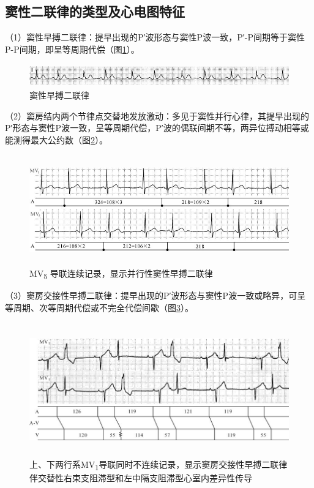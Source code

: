 \subsection{窦性二联律的类型及心电图特征}

（1）窦性早搏二联律：提早出现的P′波形态与窦性P波一致，P′-P间期等于窦性P-P间期，即呈等周期代偿（图\ref{fig37-1}）。

\begin{figure}[!htbp]
 \centering
 \includegraphics[width=5.58333in,height=0.38542in]{./images/Image00595.jpg}
 \captionsetup{justification=centering}
 \caption{窦性早搏二联律}
 \label{fig37-1}
  \end{figure} 

（2）窦房结内两个节律点交替地发放激动：多见于窦性并行心律，其提早出现的P′形态与窦性P波一致，呈等周期代偿，P′波的偶联间期不等，两异位搏动相等或能测得最大公约数（图\ref{fig37-2}）。

\begin{figure}[!htbp]
 \centering
 \includegraphics[width=5.69792in,height=1.875in]{./images/Image00596.jpg}
 \captionsetup{justification=centering}
 \caption{MV\textsubscript{5} 导联连续记录，显示并行性窦性早搏二联律}
 \label{fig37-2}
  \end{figure} 

（3）窦房交接性早搏二联律：提早出现的P′波形态与窦性P波一致或略异，可呈等周期、次等周期代偿或不完全代偿间歇（图\ref{fig37-3}）。

\begin{figure}[!htbp]
 \centering
 \includegraphics[width=5.77083in,height=2.27083in]{./images/Image00597.jpg}
 \captionsetup{justification=centering}
 \caption{上、下两行系MV\textsubscript{1}导联同时不连续记录，显示窦房交接性早搏二联律伴交替性右束支阻滞型和左中隔支阻滞型心室内差异性传导}
 \label{fig37-3}
  \end{figure} 


